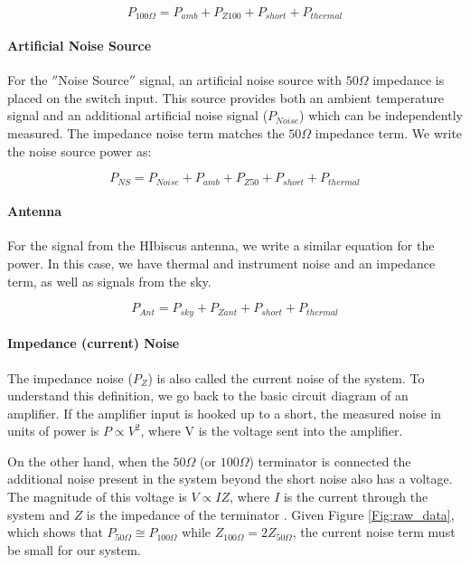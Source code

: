 \begin{equation}
P_{100 \Omega} = P_{amb}+P_{Z100}+P_{short}+P_{thermal}
\end{equation}

\paragraph{Artificial Noise Source}

For the $''$Noise Source$''$ signal, an artificial noise source with $50 \Omega$ impedance is placed on the switch input. This source provides both an ambient temperature signal and an additional artificial noise signal ($P_{Noise}$) which can be independently measured. The impedance noise term matches the $50 \Omega$ impedance term. We write the noise source power as:

\begin{equation}
P_{NS} = P_{Noise} + P_{amb}+P_{Z50}+P_{short} +P_{thermal}
\end{equation}


\paragraph{Antenna}

For the signal from the HIbiscus antenna, we write a similar equation for the power. In this case, we have thermal and instrument noise and an impedance term, as well as signals from the sky. 

\begin{equation}\label{Eq:T_ant}
P_{Ant} = P_{sky}+P_{Zant}+P_{short} + P_{thermal}
\end{equation}

\paragraph{Impedance (current) Noise} 

The impedance noise ($P_Z$) is also called the current noise of the system. To understand this definition, we go back to the basic circuit diagram of an amplifier. If the amplifier input is hooked up to a short, the measured noise in units of power is $P \propto V^2$, where V is the voltage sent into the amplifier. 

On the other hand, when the $50 \Omega$ (or $100 \Omega$) terminator is connected the additional noise present in the system beyond the short noise also has a voltage. The magnitude of this voltage is $V\propto I Z$, where $I$ is the current through the system and $Z$ is the impedance of the terminator \cite{stutzman1981}. Given Figure \ref{Fig:raw_data}, which shows that $P_{50 \Omega} \cong P_{100 \Omega}$ while $Z_{100 \Omega} = 2 Z_{50 \Omega}$, the current noise term must be small for our system. 


